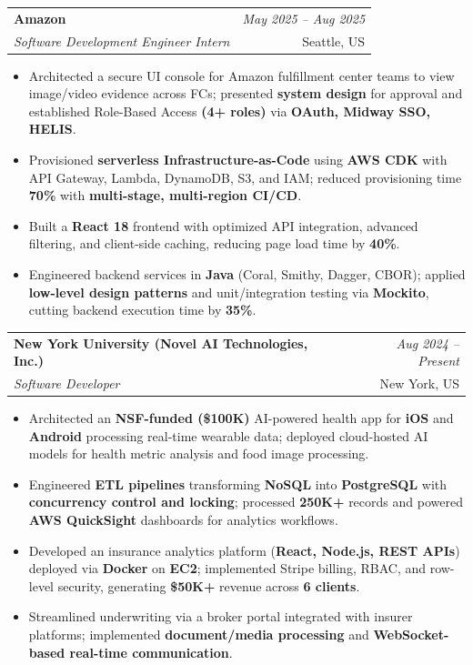 \documentclass[a4paper,10pt]{article}
\makeatletter
\newcommand{\resumeSubheading}[4]{
\vspace{0.3mm}\item
    \begin{tabular*}{0.98\textwidth}[t]{l@{\extracolsep{\fill}}r}
        \textbf{#1} & \textit{\footnotesize{#4}} \\
        \textit{\footnotesize{#3}} & \footnotesize{#2}\\
    \end{tabular*}\vspace{-2mm}
}
\newcommand{\resumeItemListStart}{\begin{itemize}[leftmargin=*, labelsep=1mm, itemsep=0pt]}
\newcommand{\resumeItemListEnd}{\end{itemize}\vspace{-2mm}}
\makeatother
\begin{document}
\resumeSubheading
{Amazon}{Seattle, US}
{Software Development Engineer Intern}{May 2025 -- Aug 2025}
\resumeItemListStart
\item \footnotesize{Architected a secure UI console for Amazon fulfillment center teams to view image/video evidence across FCs; presented \textbf{system design} for approval and established Role-Based Access \textbf{(4+ roles)} via \textbf{OAuth, Midway SSO, HELIS}.}
\item \footnotesize{Provisioned \textbf{serverless Infrastructure-as-Code} using \textbf{AWS CDK} with API Gateway, Lambda, DynamoDB, S3, and IAM; reduced provisioning time \textbf{70\%} with \textbf{multi-stage, multi-region CI/CD}.}
\item \footnotesize{Built a \textbf{React 18} frontend with optimized API integration, advanced filtering, and client-side caching, reducing page load time by \textbf{40\%}.}
\item \footnotesize{Engineered backend services in \textbf{Java} (Coral, Smithy, Dagger, CBOR); applied \textbf{low-level design patterns} and unit/integration testing via \textbf{Mockito}, cutting backend execution time by \textbf{35\%}.}
\resumeItemListEnd

\resumeSubheading
{New York University (Novel AI Technologies, Inc.)}{New York, US}
{Software Developer}{Aug 2024 -- Present}
\resumeItemListStart
\item \footnotesize{Architected an \textbf{NSF-funded (\$100K)} AI-powered health app for \textbf{iOS} and \textbf{Android} processing real-time wearable data; deployed cloud-hosted AI models for health metric analysis and food image processing.}
\item \footnotesize{Engineered \textbf{ETL pipelines} transforming \textbf{NoSQL} into \textbf{PostgreSQL} with \textbf{concurrency control and locking}; processed \textbf{250K+} records and powered \textbf{AWS QuickSight} dashboards for analytics workflows.}
\item \footnotesize{Developed an insurance analytics platform (\textbf{React, Node.js, REST APIs}) deployed via \textbf{Docker} on \textbf{EC2}; implemented Stripe billing, RBAC, and row-level security, generating \textbf{\$50K+} revenue across \textbf{6 clients}.}
\item \footnotesize{Streamlined underwriting via a broker portal integrated with insurer platforms; implemented \textbf{document/media processing} and \textbf{WebSocket-based real-time communication}.}
\resumeItemListEnd
\end{document}
